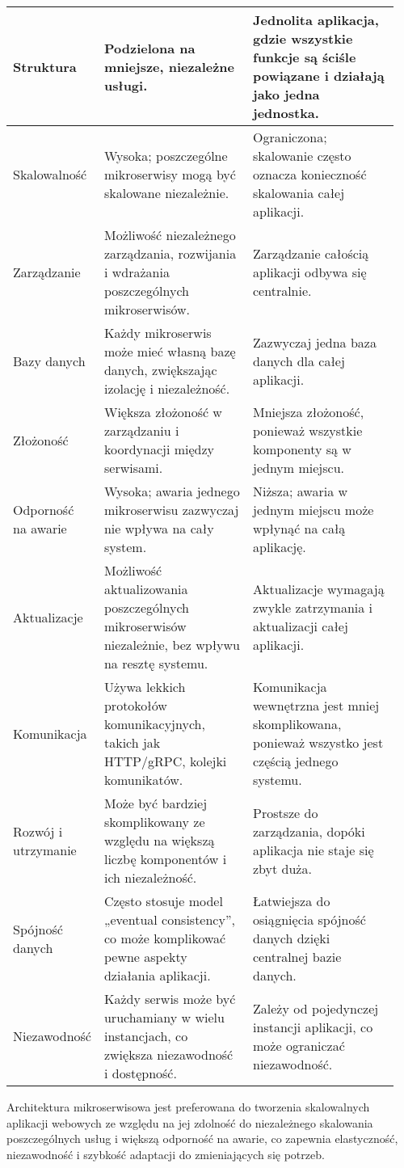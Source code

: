 \begin{longtable}{| m{0.15\linewidth} | m{0.4\linewidth} | m{0.4\linewidth} |}
    Struktura & Podzielona na mniejsze, niezależne usługi. & Jednolita aplikacja, gdzie wszystkie funkcje są ściśle powiązane i działają jako jedna jednostka. \\ \hline
    Skalowalność & Wysoka; poszczególne mikroserwisy mogą być skalowane niezależnie. & Ograniczona; skalowanie często oznacza konieczność skalowania całej aplikacji. \\ \hline
    Zarządzanie & Możliwość niezależnego zarządzania, rozwijania i wdrażania poszczególnych mikroserwisów. & Zarządzanie całością aplikacji odbywa się centralnie. \\ \hline
    Bazy danych & Każdy mikroserwis może mieć własną bazę danych, zwiększając izolację i niezależność. & Zazwyczaj jedna baza danych dla całej aplikacji. \\ \hline
    Złożoność & Większa złożoność w zarządzaniu i koordynacji między serwisami. & Mniejsza złożoność, ponieważ wszystkie komponenty są w jednym miejscu. \\ \hline
    Odporność na awarie & Wysoka; awaria jednego mikroserwisu zazwyczaj nie wpływa na cały system. & Niższa; awaria w jednym miejscu może wpłynąć na całą aplikację. \\ \hline
    Aktualizacje & Możliwość aktualizowania poszczególnych mikroserwisów niezależnie, bez wpływu na resztę systemu. & Aktualizacje wymagają zwykle zatrzymania i aktualizacji całej aplikacji. \\ \hline
    Komunikacja & Używa lekkich protokołów komunikacyjnych, takich jak HTTP/gRPC, kolejki komunikatów. & Komunikacja wewnętrzna jest mniej skomplikowana, ponieważ wszystko jest częścią jednego systemu. \\ \hline
    Rozwój i utrzymanie	& Może być bardziej skomplikowany ze względu na większą liczbę komponentów i ich niezależność. & Prostsze do zarządzania, dopóki aplikacja nie staje się zbyt duża. \\ \hline
    Spójność danych & Często stosuje model „eventual consistency”, co może komplikować pewne aspekty działania aplikacji. & Łatwiejsza do osiągnięcia spójność danych dzięki centralnej bazie danych. \\ \hline
    Niezawodność  & Każdy serwis może być uruchamiany w wielu instancjach, co zwiększa niezawodność i dostępność.		 & Zależy od pojedynczej instancji aplikacji, co może ograniczać niezawodność.
    \\ \hline
\end{longtable}

Architektura mikroserwisowa jest preferowana do tworzenia skalowalnych aplikacji webowych ze względu na jej zdolność do niezależnego skalowania poszczególnych usług i większą odporność na awarie, co zapewnia elastyczność, niezawodność i szybkość adaptacji do zmieniających się potrzeb.

